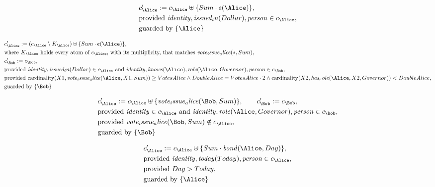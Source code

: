 \begin{align*}
&
c'_
{
\Alice
}
 := 
c_
{
\Alice
}
 \uplus 
\{
Sum
\cdot
\text{\textcent}
(
\Alice
)
\}
,\\
&
\text{provided } 
\mathit{
identity
}
,
\mathit{
issued_in
}
(
Dollar
)
,
\mathit{
person
}
 \in c_
{
\Alice
}
,\\
&
\text{guarded by } \{
\Alice
\}
\end{align*}

\begin{align*}
&
c'_
{
\Alice
}
 := 
(
c_
{
\Alice
}
 \setminus K_
{
\Alice
}
) \uplus 
\{
Sum
\cdot
\text{\textcent}
(
\Alice
)
\}
,\\
&
\text{where } K_
{
\Alice
}
 \text{ holds every atom of } c_
{
\Alice
}
 \text{, with its multiplicity, that matches } 
\mathit{
vote_issue_alice
}
(
\ast
,
Sum
)
,\\
&
c'_
{
\Bob
}
 := 
c_
{
\Bob
}
,\\
&
\text{provided } 
\mathit{
identity
}
,
\mathit{
issued_in
}
(
Dollar
)
 \in c_
{
\Alice
}
 \text{ and } 
\mathit{
identity
}
,
\mathit{
knows
}
(
\Alice
)
,
\mathit{
role
}
(
\Alice
,
Governor
)
,
\mathit{
person
}
 \in c_
{
\Bob
}
,\\
&
\text{provided } 
\mathrm{cardinality}(
X1
,
\mathit{
vote_issue_alice
}
(
\Alice
,
X1
,
Sum
)
)
\ge
VotesAlice
\land
DoubleAlice
=
VotesAlice
\cdot
2
\land
\mathrm{cardinality}(
X2
,
\mathit{
has_role
}
(
\Alice
,
X2
,
Governor
)
)
<
DoubleAlice
,\\
&
\text{guarded by } \{
\Bob
\}
\end{align*}

\begin{align*}
&
c'_
{
\Alice
}
 := 
c_
{
\Alice
}
 \uplus 
\{
\mathit{
vote_issue_alice
}
(
\Bob
,
Sum
)
\}
, \qquad 
c'_
{
\Bob
}
 := 
c_
{
\Bob
}
,\\
&
\text{provided } 
\mathit{
identity
}
 \in c_
{
\Alice
}
 \text{ and } 
\mathit{
identity
}
,
\mathit{
role
}
(
\Alice
,
Governor
)
,
\mathit{
person
}
 \in c_
{
\Bob
}
,\\
&
\text{provided } 
\mathit{
vote_issue_alice
}
(
\Bob
,
Sum
)
 \notin c_
{
\Alice
}
,\\
&
\text{guarded by } \{
\Bob
\}
\end{align*}

\begin{align*}
&
c'_
{
\Alice
}
 := 
c_
{
\Alice
}
 \uplus 
\{
Sum
\cdot
\mathit{
bond
}
(
\Alice
,
Day
)
\}
,\\
&
\text{provided } 
\mathit{
identity
}
,
\mathit{
today
}
(
Today
)
,
\mathit{
person
}
 \in c_
{
\Alice
}
,\\
&
\text{provided } 
Day
>
Today
,\\
&
\text{guarded by } \{
\Alice
\}
\end{align*}
